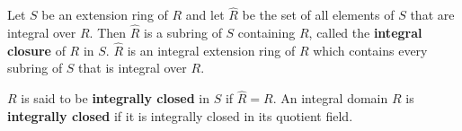 Let $S$ be an extension ring of $R$ and let $\hat{R}$ be the set of all elements of $S$ that are integral over $R$. Then $\hat{R}$ is a subring of $S$ containing $R$, called the \textbf{integral closure} of $R$ in $S$. $\hat{R}$ is an integral extension ring of $R$ which contains every subring of $S$ that is integral over $R$.

$R$ is said to be \textbf{integrally closed} in $S$ if $\hat{R} = R$. An integral domain $R$ is \textbf{integrally closed} if it is integrally closed in its quotient field.

